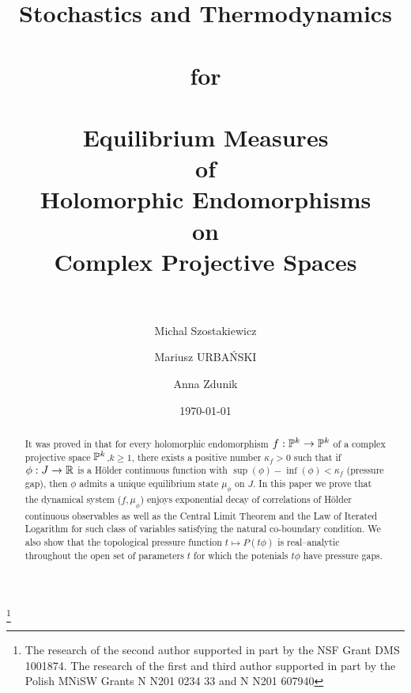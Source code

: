 \documentclass[12pt]{amsart}
\numberwithin{equation}{section}
\def\ka{\kappa}
\begin{document}

\title[]
{ \bf\large {\Large S}tochastics and Thermodynamics \\ \ \\ for \\ \ \\
  Equilibrium Measures \\ of \\ Holomorphic 
  Endomorphisms \\ on \\ Complex Projective Spaces \\ \ \ }
\date{\today}

\author[\sc Michal SZOSTAKIEWICZ]{\sc Michal Szostakiewicz}
\address{Anna Zdunik, Institute of Mathematics, Warsaw University,
ul. Banacha 2, 02-097 Warszawa, Poland}
\author[\sc Mariusz URBA\'NSKI]{\sc Mariusz URBA\'NSKI}
\address{Mariusz Urba\'nski, Department of Mathematics,
 University of North Texas, Denton, TX 76203-1430, USA}
\author[\sc Anna ZDUNIK]{\sc Anna Zdunik}
\address{Anna Zdunik, Institute of Mathematics, Warsaw University,
ul. Banacha 2, 02-097 Warszawa, Poland}

%
\thanks{The research of the second author supported in part by the
NSF Grant DMS 1001874. The research of the first and third
author supported in 
part by the Polish MNiSW Grants N N201 0234 33 and N N201 607940}

\begin{abstract}
It was proved in \cite{uzpk} that for every  holomorphic endomorphism
$f:{\mathbb P}^k\to{\mathbb P}^k$ of a complex 
projective space ${\mathbb P}^k$,$k\ge 1$, there exists a positive number
$\ka_f>0$ such that if $\phi:J\to{\mathbb R}$ is a H\"older continuous
function with $\sup(\phi)-\inf(\phi)<\ka_f$ (pressure gap), then $\phi$ admits a
unique equilibrium state $\mu_\phi$ on $J$. In this paper we prove
that the dynamical system ($f,\mu_\phi$) enjoys exponential 
decay of correlations of H\"older continuous observables as well as
the Central Limit Theorem and the Law of Iterated Logarithm for such
class of variables satisfying the natural co-boundary condition. We
also show that the topological pressure
function $t\mapsto P(t\phi)$ is real--analytic throughout the open set
of parameters $t$ for which  the potenials $t\phi$ have pressure gaps.
\end{abstract}
\end{document}
